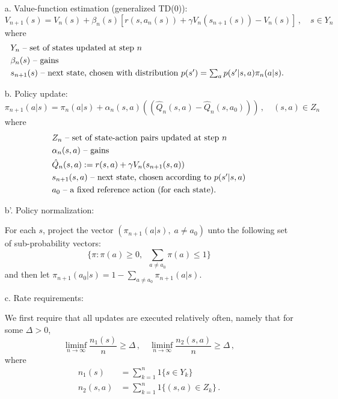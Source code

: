 \begin{itemize}
\item[a.]
Value-function estimation (generalized TD(0)):
$$
V_{n+1}(s)=V_n(s)+\beta_n(s)[r(s,a_n(s))+\gamma V_n(s_{n+1}(s))-V_n(s)]\,,\quad s\in Y_n
$$
where
\begin{align*}
&  Y_n   \mbox{ \rm -- set of states updated at step $n$} \\
&  \beta_n(s)  \mbox{ \rm -- gains }\\
& s_{n+1}(s)  \mbox { \rm -- next state, chosen with distribution\ }
         \mbox{\rm $p(s') = \sum_a p(s'|s,a)\pi_n(a|s)$.
}
\end{align*}

\item[b.] Policy update:
$$
\pi_{n+1}(a|s)=\pi_{n}(a|s) + \alpha_n(s,a) (( \hat{Q}_n(s,a) - \hat{Q}_n(s,a_0) ))\,,
\quad (s,a) \in Z_n
$$
where
\begin{align*}
& Z_n  \mbox{ \rm -- set of state-action pairs  updated at step $n$} \\
& \alpha_n(s,a) \mbox{ \rm -- gains} \\
& \hat{Q}_n(s,a):=r(s,a)+\gamma V_n(s_{n+1}(s,a))\\
& s_{n+1}(s,a) \mbox{ \rm -- next state, chosen according to $p(s'|s,a)$} \\
& a_0 \mbox { \rm -- a fixed reference action (for each state).}
\end{align*}

\item[b'.] Policy normalization:

For each $s$, project the vector $(\pi_{n+1}(a|s),\; a\not= a_0)$ unto the
following set
of sub-probability vectors:
$$
\{\pi: \pi(a)\ge 0,\;\; \sum_{a\not = a_0}\pi(a)\le 1\}
$$
and then let $\pi_{n+1}(a_0|s)=1-\sum_{ a\not = a_0}\pi_{n+1}(a|s) $.


\item[c.] Rate requirements:

We first require that all updates are executed relatively often, namely that for
some $\Delta>0$,
$$
\liminf_{n\to\infty}\frac{n_1(s)}{n} \ge \Delta\,,\quad
\liminf_{n\to\infty}\frac{n_2(s,a)}{n} \ge \Delta\,,
$$
where
\begin{align*}
n_1(s) &= \sum_{k=1}^n 1\{s\in Y_k\} \\
n_2(s,a) &= \sum_{k=1}^n 1\{(s,a) \in Z_k\} \,.
\end{align*}


\end{itemize}
